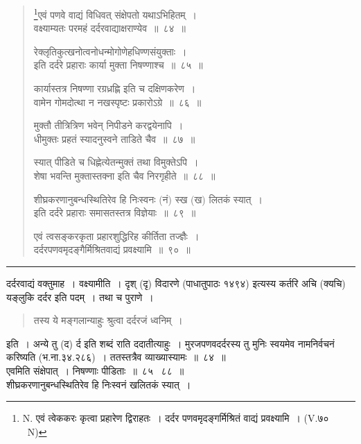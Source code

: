 \documentclass[11pt, openany]{book}
\begin{document}
\newpage

\begin{quote}
{\na \renewcommand{\thefootnote}{1}\footnote{N. एवं त्वेककरः कृत्वा प्रहारेण द्विराहतः~। दर्दर पणवमृदङ्गर्मिश्रितं वाद्यं प्रवक्ष्यामि~। (V.७० \textendash\ N)}एवं पणवे वाद्यं विधिवत् संक्षेपतो यथाऽभिहितम्~।\\
वक्ष्याम्यतः परमहं दर्दरवाद्याक्षराण्येव~॥~८४~॥

रेक्लृतिकुत्खनोत्वनोधन्मोगोणेहधिण्णसंयुक्ताः~।\\
इति दर्दरे प्रहाराः कार्या मुक्ता निषण्णाश्च~॥~८५~॥

कार्यास्तत्र निषण्णा रग्रध्रह्णि इति च दक्षिणकरेण~।\\
वामेन गोमदोत्था न नखस्पृष्टः प्रकारोऽग्रे~॥~८६~॥

मुक्तौ तीत्रित्रिण भवेन् निपीडने करद्वयेनापि~।\\
धीमुक्तः प्रहतं स्यादनुस्वने ताडिते चैव~॥~८७~॥

स्यात् पीडिते च धिह्णेत्येतन्मुक्तं तथा विमुक्तेऽपि~।\\
शेषा भवन्ति मुक्तास्तक्ना इति चैव निरगृहीते~॥~८८~॥

शीघ्रकरणानुबन्धस्थितिरेव हि निःस्वनः (नं) स्ख (ख) लितकं स्यात्~।\\
इति दर्दरे प्रहाराः समासतस्तत्र विज्ञेयाः~॥~८९~॥

एवं त्वसङ्करकृता प्रहारशुद्धिरिह कीर्तिता तज्ज्ञैः~।\\
दर्दरपणवमृदङ्गैर्मिश्रितवाद्यं प्रवक्ष्यामि~॥~९०~॥}
\end{quote}

\hrule

\vspace{2mm}
\noindent
दर्दरवाद्यं वक्तुमाह~। वक्ष्यामीति~। दृश् (दृ) विदारणे  (पाधातुपाठः १४९४) इत्यस्य कर्तरि अचि (क्यचि) यङ्लुकि दर्दर इति पदम्~। तथा च पुराणे~। 

\begin{quote}
{\qt तस्य ये मङ्गलान्याहुः श्रुत्वा दर्दरजं ध्वनिम्~।}
\end{quote}

\noindent
इति~। अन्ये तु (द) र्द इति शब्दं राति ददातीत्याहुः~। मुरजपणवदर्दरस्य तु मुनिः स्वयमेव नामनिर्वचनं करिष्यति (भ.ना.३४.२८६)~। ततस्तत्रैव व्याख्यास्यामः~॥~८४~॥\\

{\qtt एवमिति} संक्षेपात्~। निषण्णाः पीडिताः~॥~८५ \textendash\ ८८~॥\\

{\qt शीघ्रकरणानुबन्धस्थितिरेव हि निःस्वनं खलितकं स्यात्~।}
\end{document}
